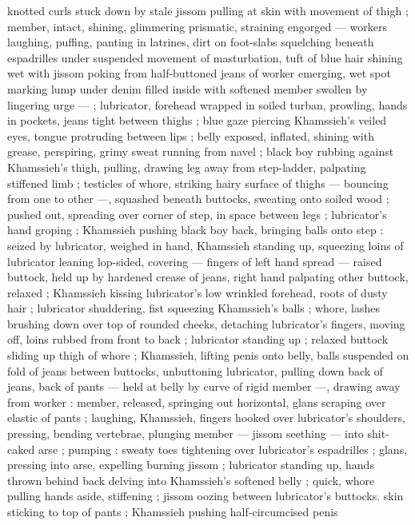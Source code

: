 knotted curls stuck down by stale jissom pulling at skin with
movement of thigh ; member, intact, shining, glimmering prismatic,
straining engorged --- workers laughing, puffing, panting in latrines,
dirt on foot-slabs squelching beneath espadrilles under suspended
movement of masturbation, tuft of blue hair shining wet with jissom
poking from half-buttoned jeans of worker emerging, wet spot
marking lump under denim filled inside with softened member
swollen by lingering urge --- ; lubricator, forehead wrapped in soiled
turban, prowling, hands in pockets, jeans tight between thighs ; blue
gaze piercing Khamssieh's veiled eyes, tongue protruding between
lips ; belly exposed, inflated, shining with grease, perspiring, grimy
sweat running from navel ; black boy rubbing against Khamssieh's
thigh, pulling, drawing leg away from step-ladder, palpating stiffened
limb ; testicles of whore, striking hairy surface of thighs --- bouncing
from one to other ---, squashed beneath buttocks, sweating onto
soiled wood ; pushed out, spreading over corner of step, in space
between legs ; lubricator's hand groping ; Khamssieh pushing black
boy back, bringing balls onto step : seized by lubricator, weighed in
hand, Khamssieh standing up, squeezing loins of lubricator leaning
lop-sided, covering --- fingers of left hand spread --- raised buttock,
held up by hardened crease of jeans, right hand palpating other
buttock, relaxed ; Khamssieh kissing lubricator’s low wrinkled
forehead, roots of dusty hair ; lubricator shuddering, fist squeezing
Khamssieh's balls ; whore, lashes brushing down over top of
rounded cheeks, detaching lubricator's fingers, moving off, loins
rubbed from front to back ; lubricator standing up ; relaxed buttock
sliding up thigh of whore ; Khamssieh, lifting penis onto belly, balls
suspended on fold of jeans between buttocks, unbuttoning
lubricator, pulling down back of jeans, back of pants --- held at belly
by curve of rigid member ---, drawing away from worker : member,
released, springing out horizontal, glans scraping over elastic of
pants ; laughing, Khamssieh, fingers hooked over lubricator’s
shoulders, pressing, bending vertebrae, plunging member --- jissom
seething --- into shit-caked arse ; pumping : sweaty toes tightening
over lubricator's espadrilles ; glans, pressing into arse, expelling
burning jissom ; lubricator standing up, hands thrown behind back
delving into Khamssieh's softened belly ; quick, whore pulling hands
aside, stiffening ; jissom oozing between lubricator's buttocks. skin
sticking to top of pants ; Khamssieh pushing half-circumcised penis
